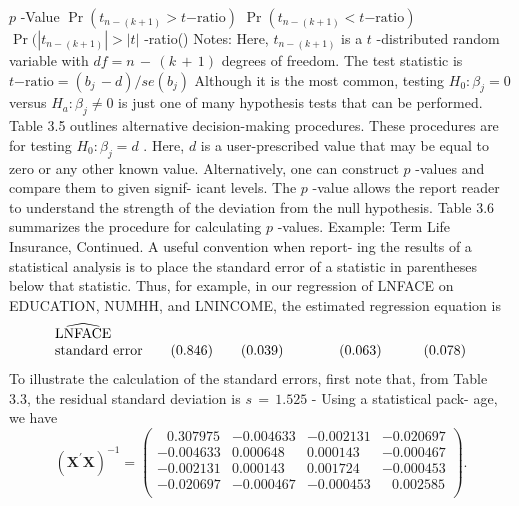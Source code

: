 \documentclass[11pt]{article}
\begin{document}
\(p\) -Value \(\operatorname* {P r} ( t_{n-( k+1 )} > t \mathrm{-r a t i o} )\) \(\operatorname* {P r} ( t_{n-( k+1 )} < t \mathrm{-r a t i o} )\) \(\operatorname* {P r} ( | t_{n-( k+1 )} | > | t |\) -ratio()
Notes: Here, \(t_{n-( k+1 )}\) is a \(t\) -distributed random variable with \(d f=n \,-\, ( k \,+\, 1 )\) degrees of
freedom. The test statistic is \(t \mathrm{-r a t i o}=( b_{j} \,-d ) / s e ( b_{j} )\)
Although it is the most common, testing \(H_{0} : \beta_{j}=0\) versus \(H_{a} : \beta_{j} \neq0\) is just
 one of many hypothesis tests that can be performed. Table 3.5 outlines alternative
 decision-making procedures. These procedures are for testing \(H_{0} : \beta_{j}=d\) . Here,
\(d\) is a user-prescribed value that may be equal to zero or any other known value.
Alternatively, one can construct \(p\) -values and compare them to given signif-
icant levels. The \(p\) -value allows the report reader to understand the strength of
the deviation from the null hypothesis. Table 3.6 summarizes the procedure for
calculating \(p\) -values.
Example: Term Life Insurance, Continued. \(\mathrm{A}\) useful convention when report-
 ing the results of a statistical analysis is to place the standard error of a statistic in
 parentheses below that statistic. Thus, for example, in our regression of LNFACE
 on EDUCATION, NUMHH, and LNINCOME, the estimated regression equation
is
\[
\begin{array} {l} {\widehat{\mathrm{L N F A C E}}} \\ {\mathrm{s t a n d a r d ~ e r r o r} \hfill\quad\quad( 0 . 8 4 6 ) \hfill\quad\quad( 0 . 0 3 9 ) \hfill\quad\quad\quad\quad( 0 . 0 6 3 ) \hfill\quad\quad\quad( 0 . 0 7 8 )} \\ \end{array}
\]
To illustrate the calculation of the standard errors, first note that, from
Table 3.3, the residual standard deviation is \(s \,=\, 1 . 5 2 5\) - Using a statistical pack-
 age, we have
\[
\left( \mathbf{X}^{\prime} \mathbf{X} \right)^{-1}=\left( \begin{matrix} {\; \; \, 0 . 3 0 7 9 7 5} & {-0 . 0 0 4 6 3 3} & {-0 . 0 0 2 1 3 1} & {-0 . 0 2 0 6 9 7} \\ {-0 . 0 0 4 6 3 3} & {0 . 0 0 0 6 4 8} & {0 . 0 0 0 1 4 3} & {-0 . 0 0 0 4 6 7} \\ {-0 . 0 0 2 1 3 1} & {0 . 0 0 0 1 4 3} & {0 . 0 0 1 7 2 4} & {-0 . 0 0 0 4 5 3} \\ {-0 . 0 2 0 6 9 7} & {-0 . 0 0 0 4 6 7} & {-0 . 0 0 0 4 5 3} & {\; \; \, 0 . 0 0 2 5 8 5} \\ \end{matrix} \right) .
\]
\end{document}
